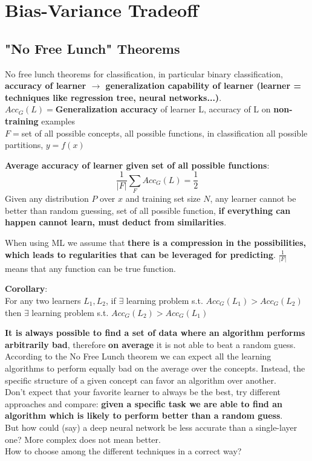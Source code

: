 
\section{Bias-Variance Tradeoff}
\subsection{"No Free Lunch" Theorems}
    No free lunch theorems for classification, in particular binary classification, \textbf{accuracy of learner $\rightarrow$ generalization capability of learner (learner = techniques like regression tree, neural networks...)}.\\
    $Acc_G(L)=$\textbf{Generalization accuracy} of learner L, accuracy of L on \textbf{non-training} examples\\
    $F=$set of all possible concepts, all possible functions, in classification all possible partitions, $y=f(x)$

    \vspace{1em}
    \textbf{Average accuracy of learner given set of all possible functions}:\\
    $$\frac{1}{|F|}\sum_FAcc_G(L)=\frac{1}{2}$$
    Given any distribution $P$ over $x$ and training set size $N$, any learner cannot be better than random guessing, set of all possible function, \textbf{if everything can happen cannot learn, must deduct from similarities}.

    \vspace{1em}
    When using ML we assume that \textbf{there is a compression in the possibilities, which leads to regularities that can be leveraged for predicting}. $\frac{1}{|F|}$ means that any function can be true function.

    \vspace{1em}
    \textbf{Corollary}:\\
    For any two learners $L_1,L_2$, if $\exists$ learning problem s.t. $Acc_G(L_1)>Acc_G(L_2)$ then $\exists$ learning problem s.t. $Acc_G(L_2)>Acc_G(L_1)$

    \vspace{1em}
    \textbf{It is always possible to find a set of data where an algorithm performs arbitrarily bad}, therefore \textbf{on average} it is not able to beat a random guess.\\
    According to the No Free Lunch theorem we can expect all the learning algorithms
    to perform equally bad on the average over the concepts. Instead, the specific structure of a given concept can favor an algorithm over another.\\
    Don't expect that your favorite learner to always be the best, try different approaches and compare: \textbf{given a specific task we are able to find an algorithm which is likely to perform better than a random guess}.\\But how could (say) a deep neural network be less accurate than a single-layer one? More complex does not mean better.\\How to choose among the different techniques in a correct way?
